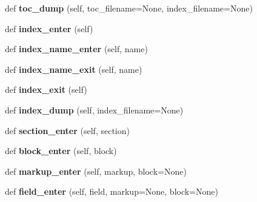 \begin{DoxyCompactItemize}
\mbox{\label{classformatter_1_1_formatter_a820c4494f6716a7163130256ce226549}} 
def {\bfseries toc\+\_\+dump} (self, toc\+\_\+filename=None, index\+\_\+filename=None)
\item 
\mbox{\label{classformatter_1_1_formatter_a3a07309d0b6acf49a916f9bbee67a81c}} 
def {\bfseries index\+\_\+enter} (self)
\item 
\mbox{\label{classformatter_1_1_formatter_af0b5c15dc5c46f6a357bb13f1bc8745f}} 
def {\bfseries index\+\_\+name\+\_\+enter} (self, name)
\item 
\mbox{\label{classformatter_1_1_formatter_aa3be4d32dd5a6e71b4860b38db7e3458}} 
def {\bfseries index\+\_\+name\+\_\+exit} (self, name)
\item 
\mbox{\label{classformatter_1_1_formatter_a0a5667999796bdc84ba674f6cac58e37}} 
def {\bfseries index\+\_\+exit} (self)
\item 
\mbox{\label{classformatter_1_1_formatter_a34af2f45c8da0713dcbc05e00d0472fd}} 
def {\bfseries index\+\_\+dump} (self, index\+\_\+filename=None)
\item 
\mbox{\label{classformatter_1_1_formatter_a84024c1e9fd55aef8b637765a3802f6c}} 
def {\bfseries section\+\_\+enter} (self, section)
\item 
\mbox{\label{classformatter_1_1_formatter_aa1e93edcecc9d1da0223459bc7cb5062}} 
def {\bfseries block\+\_\+enter} (self, block)
\item 
\mbox{\label{classformatter_1_1_formatter_a02f0dc2981394305c7d9f1451d585321}} 
def {\bfseries markup\+\_\+enter} (self, markup, block=None)
\item 
\mbox{\label{classformatter_1_1_formatter_a05aa3c61a5a05539e60efe8fd77bb6e6}} 
def {\bfseries field\+\_\+enter} (self, field, markup=None, block=None)
\item 
\mbox{\label{classformatter_1_1_formatter_ad3b5dac71f3808724b5c85ac0cb065ed}} 

\end{DoxyCompactItemize}
